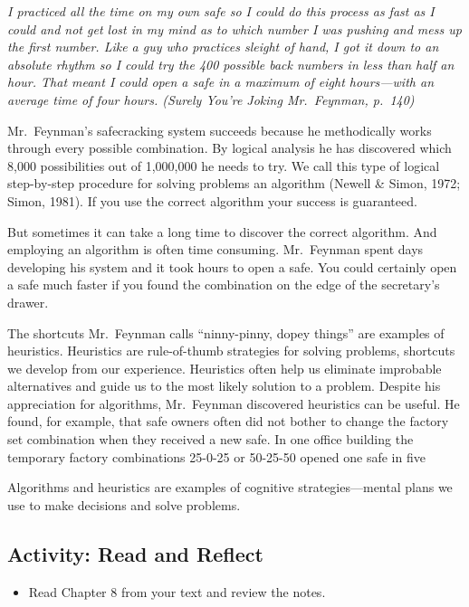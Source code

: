 \documentclass[
]{book}
\providecommand{\tightlist}{%
  \setlength{\itemsep}{0pt}\setlength{\parskip}{0pt}}
\begin{document}
\emph{I practiced all the time on my own safe so I could do this process as fast as I could and not get lost in my mind as to which number I was pushing and mess up the first number. Like a guy who practices sleight of hand, I got it down to an absolute rhythm so I could try the 400 possible back numbers in less than half an hour. That meant I could open a safe in a maximum of eight hours---with an average time of four hours. (Surely You're Joking Mr.~Feynman, p.~140)}

Mr.~Feynman's safecracking system succeeds because he methodically works through every possible combination. By logical analysis he has discovered which 8,000 possibilities out of 1,000,000 he needs to try. We call this type of logical step-by-step procedure for solving problems an algorithm (Newell \& Simon, 1972; Simon, 1981). If you use the correct algorithm your success is guaranteed.

But sometimes it can take a long time to discover the correct algorithm. And employing an algorithm is often time consuming. Mr.~Feynman spent days developing his system and it took hours to open a safe. You could certainly open a safe much faster if you found the combination on the edge of the secretary's drawer.

The shortcuts Mr.~Feynman calls ``ninny-pinny, dopey things'' are examples of heuristics. Heuristics are rule-of-thumb strategies for solving problems, shortcuts we develop from our experience. Heuristics often help us eliminate improbable alternatives and guide us to the most likely solution to a problem. Despite his appreciation for algorithms, Mr.~Feynman discovered heuristics can be useful. He found, for example, that safe owners often did not bother to change the factory set combination when they received a new safe. In one office building the temporary factory combinations 25-0-25 or 50-25-50 opened one safe in five

Algorithms and heuristics are examples of cognitive strategies---mental plans we use to make decisions and solve problems.

\hypertarget{activity-read-and-reflect}{%
\subsection*{Activity: Read and Reflect}\label{activity-read-and-reflect}}

\begin{reflect}
\begin{itemize}
\tightlist
\item
  Read Chapter 8 from your text and review the notes.
\end{itemize}
\end{reflect}
\end{document}

